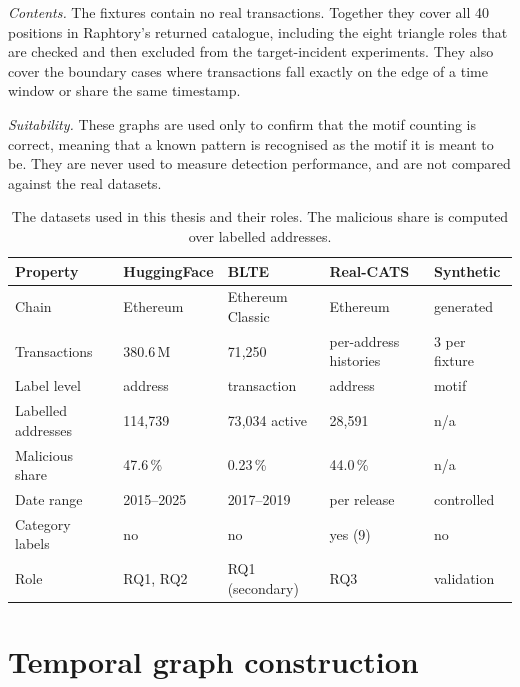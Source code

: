 \documentclass{thesisclass}
\begin{document}
\textit{Contents.} The fixtures contain no real transactions. Together they
cover all 40 positions in Raphtory's returned catalogue, including the eight
triangle roles that are checked and then excluded from the target-incident
experiments. They also cover the boundary cases where transactions fall exactly
on the edge of a time window or share the same timestamp.

\textit{Suitability.} These graphs are used only to confirm that the motif
counting is correct, meaning that a known pattern is recognised as the motif it
is meant to be. They are never used to measure detection performance, and are
not compared against the real datasets.

\begin{table}[ht]
\centering
\caption{The datasets used in this thesis and their roles. The malicious share
is computed over labelled addresses.}
\label{tab:dataset_comparison}
\footnotesize
\setlength{\tabcolsep}{4pt}
\begin{tabular}{@{}p{2.7cm} p{2.5cm} p{2.4cm} p{2.6cm} p{1.9cm}@{}}
\toprule
\textbf{Property} & \textbf{HuggingFace} & \textbf{BLTE} & \textbf{Real-CATS} & \textbf{Synthetic} \\
\midrule
Chain              & Ethereum      & Ethereum Classic & Ethereum      & generated \\
Transactions       & 380.6\,M      & 71{,}250         & per-address histories & 3 per fixture \\
Label level        & address       & transaction      & address       & motif \\
Labelled addresses & 114{,}739     & 73{,}034 active  & 28{,}591      & n/a \\
Malicious share    & 47.6\,\%      & 0.23\,\%         & 44.0\,\%      & n/a \\
Date range         & 2015--2025    & 2017--2019       & per release   & controlled \\
Category labels    & no            & no               & yes (9)       & no \\
Role               & RQ1, RQ2      & RQ1 (secondary)  & RQ3           & validation \\
\bottomrule
\end{tabular}
\end{table}

\section{Temporal graph construction}
\label{sec:graph_construction}
\end{document}
